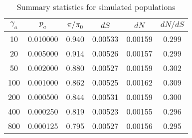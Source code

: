 
\begin{table}
\label{tab:summaryStats}
   \centering
   \begin{threeparttable}[b]
\caption{Summary statistics for simulated populations}

\begin{tabular}{cccccc}
\toprule
 $\gamma_a$ &       $p_a$ &   $\pi / \pi_0$ &        $dS$ &        $dN$ &     $dN/dS$ \\
\midrule
       10 &  0.010000 &  0.940 &  0.00533 &  0.00159 &  0.299 \\
      20 &  0.005000 &  0.914 &  0.00526 &  0.00157 &  0.299 \\
      50 &  0.002000 &  0.880 &  0.00527 &  0.00159 &  0.302 \\
      100 &  0.001000 &  0.862 &  0.00525 &  0.00162 &  0.309 \\
     200 &  0.000500 &  0.844 &  0.00531 &  0.00159 &  0.300 \\
     400 &  0.000250 &  0.819 &  0.00523 &  0.00155 &  0.296 \\
     800 &  0.000125 &  0.795 &  0.00527 &  0.00156 &  0.295 \\
\bottomrule
\end{tabular}

   \end{threeparttable}

   \end{table}
